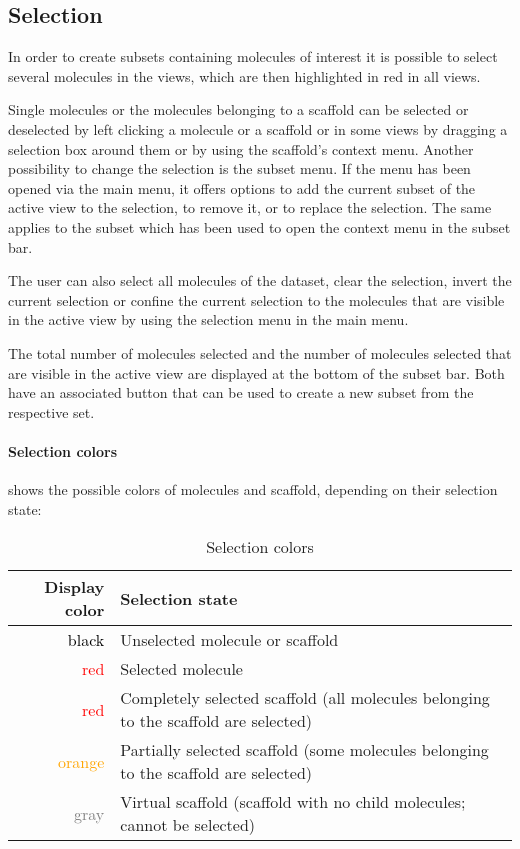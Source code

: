 \subsection{Selection}
\label{sec:linking:selection}

In order to create subsets containing molecules of interest it is possible to select several molecules in the views, which are then highlighted in red in all views.

Single molecules or the molecules belonging to a scaffold can be selected or deselected by left clicking a molecule or a scaffold or in some views by dragging a selection box around them or by using the scaffold's context menu.
Another possibility to change the selection is the subset menu. If the menu has been opened via the main menu, it offers options to add the current subset of the active view to the selection, to remove it, or to replace the selection. The same applies to the subset which has been used to open the context menu in the subset bar.

The user can also select all molecules of the dataset, clear the selection, invert the current selection or confine the current selection to the molecules that are visible in the active view by using the selection menu in the main menu.

The total number of molecules selected and the number of molecules selected that are visible in the active view are displayed at the bottom of the subset bar. Both have an associated  button that can be used to create a new subset from the respective set.

\paragraph{Selection colors}

 shows the possible colors of molecules and scaffold, depending on their selection state:
\\

\begin{table}[ht] 
  \centering
 \begin{tabular}{rl}
\textbf{Display color} &
  \textbf{Selection state} \\ \toprule
\textcolor{black}{black} &
  Unselected molecule or scaffold \\
\textcolor{red}{red} &
  Selected molecule \\
\textcolor{red}{red} &
  Completely selected scaffold (all molecules belonging to the scaffold are selected) \\
\textcolor{orange}{orange} &
  Partially selected scaffold (some molecules belonging to the scaffold are selected) \\
\textcolor{gray}{gray} &
  Virtual scaffold (scaffold with no child molecules; cannot be selected) \\ \bottomrule
\end{tabular}
  \caption{Selection colors}
  \label{tab:selectioncolors}
\end{table}



